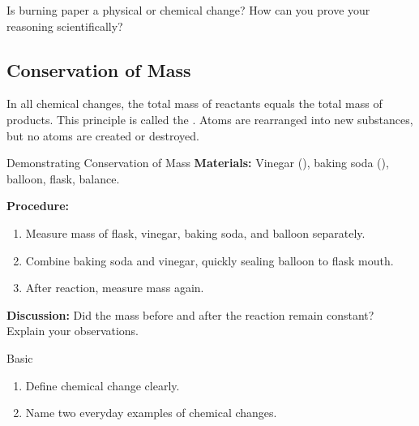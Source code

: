 \begin{stopandthink}
Is burning paper a physical or chemical change? How can you prove your reasoning scientifically?
\end{stopandthink}


\subsection{Conservation of Mass}

In all chemical changes, the total mass of reactants equals the total mass of products. This principle is called the . Atoms are rearranged into new substances, but no atoms are created or destroyed.


\begin{investigation}{Demonstrating Conservation of Mass}
\textbf{Materials:} Vinegar (), baking soda (), balloon, flask, balance.

\textbf{Procedure:}
\begin{enumerate}
    \item Measure mass of flask, vinegar, baking soda, and balloon separately.
    \item Combine baking soda and vinegar, quickly sealing balloon to flask mouth.
    \item After reaction, measure mass again.
\end{enumerate}

\textbf{Discussion:} 
Did the mass before and after the reaction remain constant? Explain your observations.
\end{investigation}

\begin{tieredquestions}{Basic}
\begin{enumerate}
    \item Define chemical change clearly.
    \item Name two everyday examples of chemical changes.
\end{enumerate}
\end{tieredquestions}

